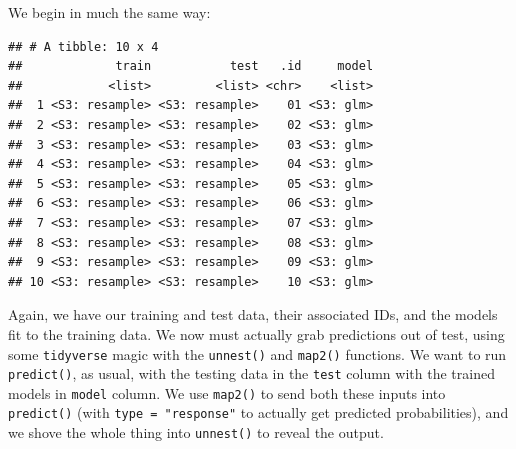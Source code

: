 \documentclass[]{article}
\newenvironment{Shaded}{\begin{snugshade}}{\end{snugshade}}
\newcommand{\KeywordTok}[1]{\textcolor[rgb]{0.13,0.29,0.53}{\textbf{#1}}}
\newcommand{\DataTypeTok}[1]{\textcolor[rgb]{0.13,0.29,0.53}{#1}}
\newcommand{\DecValTok}[1]{\textcolor[rgb]{0.00,0.00,0.81}{#1}}
\newcommand{\StringTok}[1]{\textcolor[rgb]{0.31,0.60,0.02}{#1}}
\newcommand{\OperatorTok}[1]{\textcolor[rgb]{0.81,0.36,0.00}{\textbf{#1}}}
\newcommand{\NormalTok}[1]{#1}
\begin{document}
We begin in much the same way:

\begin{Shaded}
\end{Shaded}

\begin{verbatim}
## # A tibble: 10 x 4
##             train           test   .id     model
##            <list>         <list> <chr>    <list>
##  1 <S3: resample> <S3: resample>    01 <S3: glm>
##  2 <S3: resample> <S3: resample>    02 <S3: glm>
##  3 <S3: resample> <S3: resample>    03 <S3: glm>
##  4 <S3: resample> <S3: resample>    04 <S3: glm>
##  5 <S3: resample> <S3: resample>    05 <S3: glm>
##  6 <S3: resample> <S3: resample>    06 <S3: glm>
##  7 <S3: resample> <S3: resample>    07 <S3: glm>
##  8 <S3: resample> <S3: resample>    08 <S3: glm>
##  9 <S3: resample> <S3: resample>    09 <S3: glm>
## 10 <S3: resample> <S3: resample>    10 <S3: glm>
\end{verbatim}

Again, we have our training and test data, their associated IDs, and the
models fit to the training data. We now must actually grab predictions
out of test, using some \texttt{tidyverse} magic with the
\texttt{unnest()} and \texttt{map2()} functions. We want to run
\texttt{predict()}, as usual, with the testing data in the \texttt{test}
column with the trained models in \texttt{model} column. We use
\texttt{map2()} to send both these inputs into \texttt{predict()} (with
\texttt{type\ =\ "response"} to actually get predicted probabilities),
and we shove the whole thing into \texttt{unnest()} to reveal the
output.

\begin{Shaded}
\end{Shaded}
\end{document}
